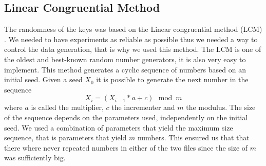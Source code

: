 \documentclass{article}
\begin{document}
		\subsection*{Linear Congruential Method}
		The randomness of the keys was based on the Linear congruential method (LCM) \cite{BOOK:2}. 
		We needed to have experiments as reliable as possible thus we needed a way to control the data generation, 
		that is why we used this method. The LCM is one of the oldest and best-known random number generators, 
		it is also very easy to implement. This method generates a cyclic sequence of numbers based on an initial seed. 
		Given a seed $X_0$ it is possible to generate the next number in the sequence 
		\begin{equation}
		X_i = (X_{i-1} * a + c) \, \bmod m
		\end{equation}
		 where $a$ is called the multiplier, $c$ the incrementer and $m$ the modulus. 
		 The size of the sequence depends on the parameters used, independently on the initial seed.
		  We used a combination of parameters that yield the maximum size sequence, that is parameters that yield $m$ numbers.  
		  This ensured us that that there where never repeated numbers in either of the two files since the size of $m$ was
		  sufficiently big. 
		  
		   
\end{document}
